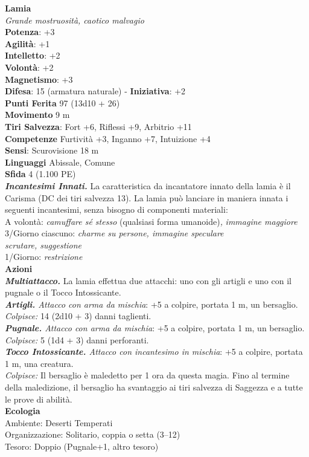 \begin{multicols}{2}
\medskip\textbf{Lamia}\\
\emph{Grande mostruosità, caotico malvagio}\\
\textbf{Potenza}: +3\\
\textbf{Agilità}: +1\\
\textbf{Intelletto}: +2\\
\textbf{Volontà}: +2\\
\textbf{Magnetismo}: +3\\
\textbf{Difesa}: 15 (armatura naturale) - \textbf{Iniziativa}: +2\\
\textbf{Punti Ferita} 97 (13d10 + 26)\\
\textbf{Movimento} 9 m\\
\textbf{Tiri Salvezza}: Fort +6, Riflessi +9, Arbitrio +11\\
\textbf{Competenze} Furtività +3, Inganno +7, Intuizione +4\\
\textbf{Sensi}: Scurovisione 18 m\\
\textbf{Linguaggi} Abissale, Comune\\
\textbf{Sfida} 4 (1.100 PE)\smallskip\\
\emph{\textbf{Incantesimi Innati.}} La caratteristica da incantatore innato della lamia è il Carisma (DC dei tiri salvezza 13). La lamia può lanciare in maniera innata i seguenti incantesimi, senza bisogno di componenti materiali:\\
A volontà: \emph{camuffare sé stesso} (qualsiasi forma umanoide)\emph{,} \emph{immagine maggiore}\\
3/Giorno ciascuno: \emph{charme su persone, immagine speculare}\\
\emph{scrutare, suggestione}\\
1/Giorno: \emph{restrizione}\\
\smallskip\textbf{Azioni}\\
\emph{\textbf{Multiattacco.}} La lamia effettua due attacchi: uno con gli artigli e uno con il pugnale o il Tocco Intossicante.\\
\emph{\textbf{Artigli.} Attacco con arma da mischia}: +5 a colpire, portata 1 m, un bersaglio.\\
\emph{Colpisce:} 14 (2d10 + 3) danni taglienti.\\
\emph{\textbf{Pugnale.} Attacco con arma da mischia}: +5 a colpire, portata 1 m, un bersaglio.\\
\emph{Colpisce:} 5 (1d4 + 3) danni perforanti.\\
\emph{\textbf{Tocco Intossicante.} Attacco con incantesimo in mischia}: +5 a colpire, portata 1 m, una creatura.\\
\emph{Colpisce:} Il bersaglio è maledetto per 1 ora da questa magia. Fino al termine della maledizione, il bersaglio ha svantaggio ai tiri salvezza di Saggezza e a tutte le prove di abilità.\\
\textbf{Ecologia}\\
Ambiente: Deserti Temperati\\
Organizzazione: Solitario, coppia o setta (3–12)\\
Tesoro: Doppio (Pugnale+1, altro tesoro)\\


\end{multicols}

